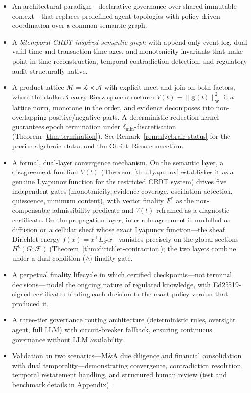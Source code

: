 \documentclass[11pt]{article}
\begin{document}
\begin{itemize}
  \item An architectural paradigm---declarative governance over shared immutable context---that replaces predefined agent topologies with policy-driven coordination over a common semantic graph.
  \item A \emph{bitemporal CRDT-inspired semantic graph} with append-only event log, dual valid-time and transaction-time axes, and monotonicity invariants that make point-in-time reconstruction, temporal contradiction detection, and regulatory audit structurally native.
  \item A product lattice $\mathcal{M} = \mathcal{L} \times \mathcal{A}$ with explicit meet and join on both factors, where the stalks $\mathcal{A}$ carry Riesz-space structure: $V(t) = \|\mathbf{g}(t)\|^2_\mathbf{w}$ is a lattice norm, monotone in the order, and evidence decomposes into non-overlapping positive/negative parts. A deterministic reduction kernel guarantees epoch termination under $\delta_{\min}$-discretisation (Theorem~\ref{thm:termination}). See Remark~\ref{rem:algebraic-status} for the precise algebraic status and the Ghrist--Riess connection.
  \item A formal, dual-layer convergence mechanism. On the semantic layer, a disagreement function $V(t)$ (Theorem~\ref{thm:lyapunov} establishes it as a genuine Lyapunov function for the restricted CRDT system) drives five independent gates (monotonicity, evidence coverage, oscillation detection, quiescence, minimum content), with vector finality $F^*$ as the non-compensable admissibility predicate and $V(t)$ reframed as a diagnostic certificate. On the propagation layer, inter-role agreement is modelled as diffusion on a cellular sheaf whose exact Lyapunov function---the sheaf Dirichlet energy $f(x) = x^\top L_{\mathcal{F}} x$---vanishes precisely on the global sections $H^0(G;\mathcal{F})$ (Theorem~\ref{thm:dirichlet-contraction}); the two layers combine under a dual-condition ($\wedge$) finality gate.
  \item A perpetual finality lifecycle in which certified checkpoints---not terminal decisions---model the ongoing nature of regulated knowledge, with Ed25519-signed certificates binding each decision to the exact policy version that produced it.
  \item A three-tier governance routing architecture (deterministic rules, oversight agent, full LLM) with circuit-breaker fallback, ensuring continuous governance without LLM availability.
  \item Validation on two scenarios---M\&A due diligence and financial consolidation with dual temporality---demonstrating convergence, contradiction resolution, temporal restatement handling, and structured human review (test and benchmark details in Appendix).
\end{itemize}
\end{document}
